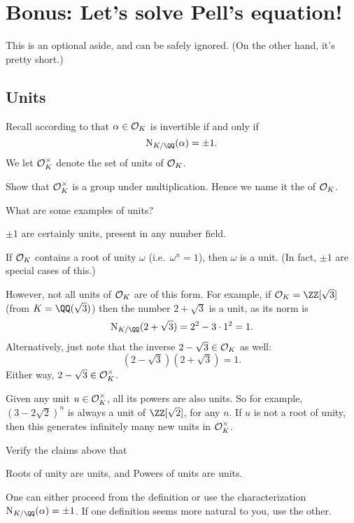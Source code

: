 \chapter{Bonus: Let's solve Pell's equation!}
This is an optional aside, and can be safely ignored.
(On the other hand, it's pretty short.)

\section{Units}
Recall according to  that $\alpha \in \mathcal O_K$ is invertible
if and only if \[ \NK(\alpha) = \pm 1. \]
We let $\mathcal O_K^\times$ denote the set of units of $\mathcal O_K$.

\begin{ques}
	Show that $\mathcal O_K^\times$ is a group under multiplication.
	Hence we name it the  of $\mathcal O_K$.
\end{ques}

What are some examples of units?
\begin{example}
	\listhack
	\begin{enumerate}
		\ii $\pm 1$ are certainly units, present in any number field.

		\ii If $\mathcal O_K$ contains a root of unity $\omega$ (i.e.\ $\omega^n=1$),
		then $\omega$ is a unit.
		(In fact, $\pm 1$ are special cases of this.)

		\ii However, not all units of $\mathcal O_K$ are of this form.
		For example, if $\OO_K = \ZZ[\sqrt3]$ (from $K = \QQ(\sqrt3)$) then
		the number $2+\sqrt3$ is a unit, as its norm is
		\[ \NK(2+\sqrt3) = 2^2 - 3 \cdot 1^2 = 1. \]
		Alternatively, just note that the inverse $2-\sqrt3 \in \mathcal O_K$ as well:
		\[ \left( 2-\sqrt3 \right)\left( 2+\sqrt3 \right) = 1. \]
		Either way, $2-\sqrt3 \in \mathcal O_K^\times$.

		\ii Given any unit $u \in \mathcal O_K^\times$, all its powers are also units.
		So for example, $(3-2\sqrt2)^n$ is always a unit of $\ZZ[\sqrt2]$, for any $n$.
		If $u$ is not a root of unity, then this generates infinitely many new units in $\mathcal O_K^\times$.
	\end{enumerate}
\end{example}

\begin{ques}
	Verify the claims above that
	\begin{enumerate}[(a)]
		\ii Roots of unity are units, and
		\ii Powers of units are units.
	\end{enumerate}
	One can either proceed from the definition
	or use the characterization $\NK(\alpha) = \pm 1$.
	If one definition seems more natural to you, use the other.
\end{ques}


